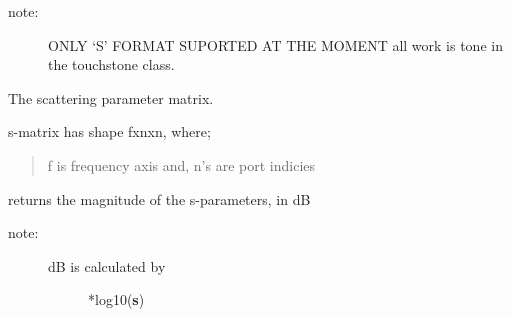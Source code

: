 \documentclass[letterpaper,10pt,english]{sphinxmanual}
\begin{document}
\begin{fulllineitems}
\begin{fulllineitems}
\begin{description}
\item[{note: }] \leavevmode
ONLY `S' FORMAT SUPORTED AT THE MOMENT 
all work is tone in the touchstone class.

\end{description}

\end{fulllineitems}


\begin{fulllineitems}
\label{auto_network:mwavepy.Network.s}
The scattering parameter matrix.

s-matrix has shape fxnxn, 
where;
\begin{quote}

f is frequency axis and,
n's are port indicies
\end{quote}

\end{fulllineitems}


\begin{fulllineitems}
\label{auto_network:mwavepy.Network.s11}
\end{fulllineitems}


\begin{fulllineitems}
\label{auto_network:mwavepy.Network.s12}
\end{fulllineitems}


\begin{fulllineitems}
\label{auto_network:mwavepy.Network.s21}
\end{fulllineitems}


\begin{fulllineitems}
\label{auto_network:mwavepy.Network.s22}
\end{fulllineitems}


\begin{fulllineitems}
\label{auto_network:mwavepy.Network.s_db}
returns the magnitude of the s-parameters, in dB
\begin{description}
\item[{note:}] \leavevmode\begin{description}
\item[{dB is calculated by }] *log10({\color{red}\bfseries{}\textbar{}s\textbar{}})


\end{description}
\end{description}
\end{fulllineitems}
\end{fulllineitems}
\end{document}
